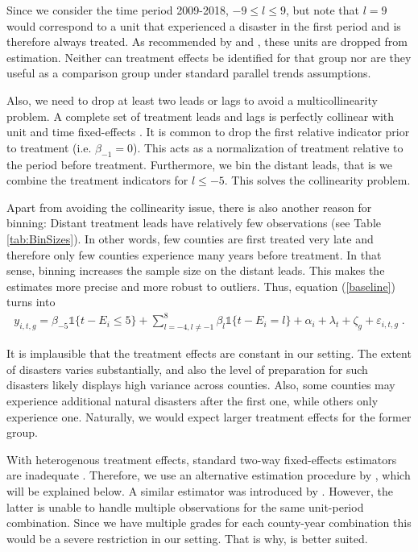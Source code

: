Since we consider the time period 2009-2018, $-9 \leq l \leq 9$, but note that $l = 9$ would correspond to a unit that experienced a disaster in the first period and is therefore always treated. As recommended by \cite{Sun_2021} and \cite{Callaway_2021}, these units are dropped from estimation. Neither can treatment effects be identified for that group nor are they useful as a comparison group under standard parallel trends assumptions.

Also, we need to drop at least two leads or lags to avoid a multicollinearity problem. A complete set of treatment leads and lags is perfectly collinear with unit and time fixed-effects \citep[for an extensive discussion of this issue see][section 3.2]{Borusyak_2021}. It is common to drop the first relative indicator prior to treatment (i.e. $\beta_{-1} = 0$). This acts as a normalization of treatment relative to the period before treatment. Furthermore, we bin the distant leads, that is we combine the treatment indicators for $l \leq -5$. This solves the collinearity problem.

Apart from avoiding the collinearity issue, there is also another reason for binning: Distant treatment leads have relatively few observations (see Table \ref{tab:BinSizes}). In other words, few counties are first treated very late and therefore only few counties experience many years before treatment. In that sense, binning increases the sample size on the distant leads. This makes the estimates more precise and more robust to outliers. Thus, equation (\ref{baseline}) turns into
\begin{align} \label{baselineBinned}
	y_{i, t, g} = \beta_{-5}  \mathds{1}\{t - E_i \leq 5\} + \sum_{l = -4, l \neq -1}^{8} \beta_l \mathds{1}\{t - E_i = l\} + \alpha_i + \lambda_t + \zeta_g + \varepsilon_{i, t, g} \;.
\end{align}



It is implausible that the treatment effects are constant in our setting. The extent of disasters varies substantially, and also the level of preparation for such disasters likely displays high variance across counties. Also, some counties may experience additional natural disasters after the first one, while others only experience one. Naturally, we would expect larger treatment effects for the former group.

With heterogenous treatment effects, standard two-way fixed-effects estimators are inadequate \citep{deChaisemartin_2020, deChaisemartin_2022, Sun_2021}. Therefore, we use an alternative estimation procedure by \cite{Sun_2021}, which will be explained below. A similar estimator was introduced by \cite{Callaway_2021}. However, the latter is unable to handle multiple observations for the same unit-period combination. Since we have multiple grades for each county-year combination this would be a severe restriction in our setting. That is why, \cite{Sun_2021} is better suited.

